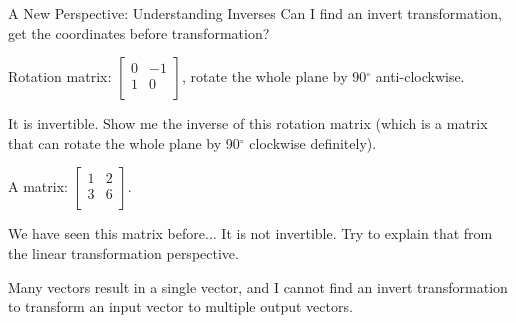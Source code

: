 \documentclass{beamer}
\begin{document}
\begin{frame}{A New Perspective: Understanding Inverses}
Can I find an invert transformation, get the coordinates before transformation?

\vspace{3pt}
Rotation matrix: $\left[ \begin{matrix}
    0&		-1\\
    1&		0\\
\end{matrix} \right]$, rotate the whole plane by 90$^\circ$ anti-clockwise.

\vspace{3pt}
It is invertible. Show me the inverse of this rotation matrix (which is a matrix that can rotate the whole plane by 90$^\circ$ clockwise definitely).

\vspace{3pt}
A matrix: $\left[ \begin{matrix}
    1&		2\\
    3&		6\\
\end{matrix} \right]$.

\vspace{3pt}
We have seen this matrix before... It is not invertible. Try to explain that from the linear transformation perspective.

\vspace{3pt}
Many vectors result in a single vector, and I cannot find an invert transformation to transform an input vector to multiple output vectors.
\end{frame}
\end{document}
